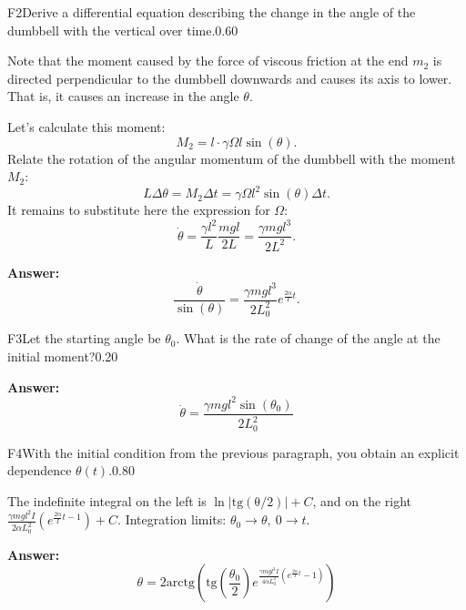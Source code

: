 \documentclass[11pt,a4paper]{article}
\begin{document}
\begin{solcard}{F2}{Derive a differential equation describing the change in the angle of the dumbbell with the vertical over time.}{0.60}

Note that the moment caused by the force of viscous friction at the end $m_2$ is directed perpendicular to the dumbbell downwards and causes its axis to lower. That is, it causes an increase in the angle $\theta$.


Let's calculate this moment: $$M_2 = l\cdot \gamma \Omega l \sin(\theta).$$ Relate the rotation of the angular momentum of the dumbbell with the moment $M_2$: $$L \Delta \theta = M_2 \Delta t= \gamma \Omega l^2 \sin(\theta) \Delta t.$$ It remains to substitute here the expression for $\Omega$: $$\dot{\theta} = \frac{\gamma l^2}{L}\frac{mgl}{2L} = \frac{\gamma mgl^3}{2L^2}.$$

\par\smallskip\noindent\textbf{Answer:} $$\frac{\dot{\theta}}{\sin(\theta)} = \frac{\gamma mgl^3}{2L_0^2}e^{\frac{2\alpha}{I}t}.$$
\end{solcard}

\begin{solcard}{F3}{Let the starting angle be $\theta_0$. What is the rate of change of the angle at the initial moment?}{0.20}
\par\smallskip\noindent\textbf{Answer:} $$\dot{\theta} = \frac{\gamma mgl^2\sin(\theta_0)}{2L_0^2}$$
\end{solcard}

\begin{solcard}{F4}{With the initial condition from the previous paragraph, you obtain an explicit dependence $\theta(t)$.}{0.80}

The indefinite integral on the left is $\ln|\mathrm{tg\left(\theta/2\right)}| + C$, and on the right $\frac{\gamma mgl^2I}{2\alpha L_0^2}\left(e^{\frac{2\alpha}{I}t - 1}\right) + C$. Integration limits: $\theta_0 \rightarrow \theta,~0\rightarrow t$.

\par\smallskip\noindent\textbf{Answer:} $$\theta = 2\mathrm{arctg}\left(\mathrm{tg}\left(\frac{\theta_0}{2}\right)e^{\frac{\gamma mgl^3I}{4\alpha L_0^2}\left(e^{\frac{2\alpha}{I}t} - 1\right) } \right)$$
\end{solcard}
\end{document}
